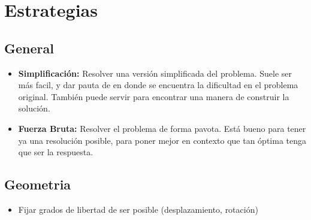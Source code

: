 \section{Estrategias}

\subsection*{General}
\begin{itemize}
    \item \textbf{Simplificación:} Resolver una versión simplificada del problema. Suele ser más facil, y dar pauta de en donde se encuentra la dificultad en el problema original. También puede servir para encontrar una manera de construir la solución.
    \item \textbf{Fuerza Bruta:} Resolver el problema de forma pavota. Está bueno para tener ya una resolución posible, para poner mejor en contexto que tan óptima tenga que ser la respuesta.
\end{itemize}

\subsection*{Geometria}
\begin{itemize}
    \item Fijar grados de libertad de ser posible (desplazamiento, rotación)
\end{itemize}
